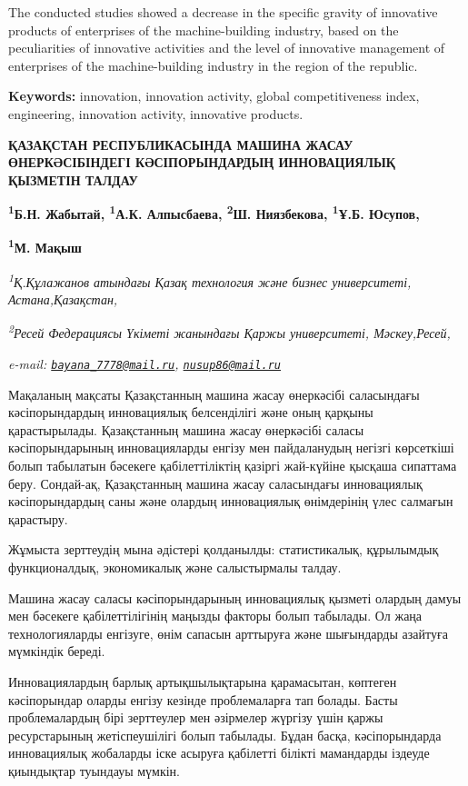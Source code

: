 The conducted studies showed a decrease in the specific gravity of
innovative products of enterprises of the machine-building industry,
based on the peculiarities of innovative activities and the level of
innovative management of enterprises of the machine-building industry in
the region of the republic.

{\bfseries Keywords:} innovation, innovation activity, global
competitiveness index, engineering, innovation activity, innovative
products.

{\bfseries ҚАЗАҚСТАН РЕСПУБЛИКАСЫНДА МАШИНА ЖАСАУ ӨНЕРКӘСІБІНДЕГІ
КӘСІПОРЫНДАРДЫҢ ИННОВАЦИЯЛЫҚ ҚЫЗМЕТІН ТАЛДАУ}

{\bfseries \textsuperscript{1}Б.Н. Жабытай\textsuperscript{\envelope },
\textsuperscript{1}А.К. Алпысбаева, \textsuperscript{2}Ш. Ниязбекова,
\textsuperscript{1}Ұ.Б. Юсупов\textsuperscript{\envelope },}

{\bfseries \textsuperscript{1}М. Мақыш}

\emph{\textsuperscript{1}Қ.Құлажанов атындағы Қазақ технология және
бизнес университеті, Астана,Қазақстан,}

\emph{\textsuperscript{2}Ресей Федерациясы Үкіметі жанындағы Қаржы
университеті, Мәскеу,Ресей,}

\emph{e-mail:
\href{mailto:bayana_7778@mail.ru}{\nolinkurl{bayana\_7778@mail.ru}},
\href{mailto:nusup86@mail.ru}{\nolinkurl{nusup86@mail.ru}}}

Мақаланың мақсаты Қазақстанның машина жасау өнеркәсібі саласындағы
кәсіпорындардың инновациялық белсенділігі және оның қарқыны
қарастырылады. Қазақстанның машина жасау өнеркәсібі саласы
кәсіпорындарының инновацияларды енгізу мен пайдаланудың негізгі
көрсеткіші болып табылатын бәсекеге қабілеттіліктің қазіргі жай-күйіне
қысқаша сипаттама беру. Сондай-ақ, Қазақстанның машина жасау саласындағы
инновациялық кәсіпорындардың саны және олардың инновациялық өнімдерінің
үлес салмағын қарастыру.

Жұмыста зерттеудің мына әдістері қолданылды: статистикалық, құрылымдық
функционалдық, экономикалық және салыстырмалы талдау.

Машина жасау саласы кәсіпорындарының инновациялық қызметі олардың дамуы
мен бәсекеге қабілеттілігінің маңызды факторы болып табылады. Ол жаңа
технологияларды енгізуге, өнім сапасын арттыруға және шығындарды
азайтуға мүмкіндік береді.

Инновациялардың барлық артықшылықтарына қарамасытан, көптеген
кәсіпорындар оларды енгізу кезінде проблемаларға тап болады. Басты
проблемалардың бірі зерттеулер мен әзірмелер жүргізу үшін қаржы
ресурстарының жетіспеушілігі болып табылады. Бұдан басқа, кәсіпорындарда
инновациялық жобаларды іске асыруға қабілетті білікті мамандарды іздеуде
қиындықтар туындауы мүмкін.

